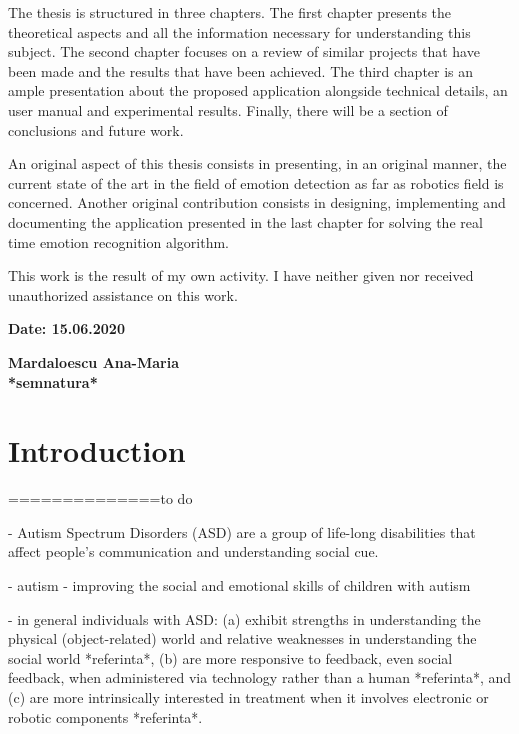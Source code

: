 \documentclass[runningheads,a4paper,12pt]{report}
\begin{document}
The thesis is structured in three chapters. The first chapter presents the theoretical aspects and all the information necessary for understanding this subject. The second chapter focuses on a review of similar projects that have been made and the results that have been achieved. The third chapter is an ample presentation about the proposed application alongside technical details, an user manual and experimental results. Finally, there will be a section of conclusions and future work.  

An original aspect of this thesis consists in presenting, in an original manner, the current state of the art in the field of emotion detection as far as robotics field is concerned. Another original contribution consists in designing, implementing and documenting the application presented in the last chapter for solving the real time emotion recognition algorithm.

This work is the result of my own activity. I have neither given nor received unauthorized assistance on this work. 

\vspace{2cm}

\begin{flushleft}
\textbf{Date: 15.06.2020}
\end{flushleft}

\begin{flushright}
\textbf{Mardaloescu Ana-Maria}\\
\textbf{*semnatura*}
\end{flushright}

\newpage

\chapter*{Introduction}
==============to do

- Autism Spectrum Disorders (ASD) are a group of life-long disabilities that affect people's communication and understanding social cue.

- autism - improving the social and emotional skills of children with autism

- in general individuals with ASD: (a) exhibit strengths in understanding the physical (object-related) world and relative weaknesses in understanding the social world *referinta*, (b) are more responsive to feedback, even social feedback, when administered via technology rather than a human *referinta*, and (c) are more intrinsically interested in treatment when it involves electronic or robotic components *referinta*.
\end{document}
